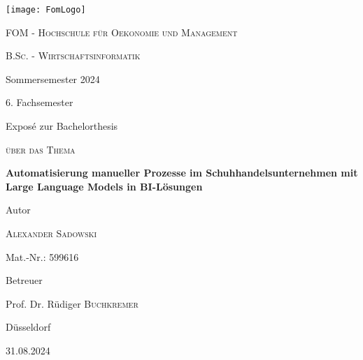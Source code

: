 
\begin{titlepage}
	
	\centering
	\texttt{[image: FomLogo]}\par\vspace{1cm}
	{\scshape\LARGE FOM - Hochschule für Oekonomie und Management \par}
	\vspace{1cm}
	{\scshape B.Sc. - Wirtschaftsinformatik\par Sommersemester 2024\par 6. Fachsemester\par Exposé zur Bachelorthesis\par}
	\vspace{1cm}
	{\scshape über das Thema\par}
	\vspace{1cm}
	{\large\bfseries Automatisierung manueller Prozesse im Schuhhandelsunternehmen mit Large Language Models in BI-Lösungen\par}
	\vspace{1.5cm}
	Autor\par
	{\large\textsc{Alexander Sadowski}\par}
	Mat.-Nr.: 599616\par
	\vfill
	Betreuer\par
	Prof. Dr. Rüdiger \textsc{Buchkremer}
	
	\vfill
	
	{Düsseldorf\par 31.08.2024\par}
\end{titlepage}